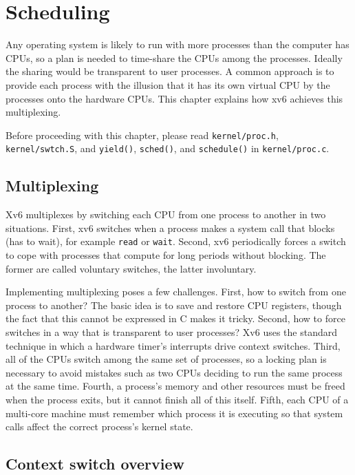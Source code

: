 % 
%  
\chapter{Scheduling}
\label{CH:SCHED}

Any operating system is likely to run with more processes than the
computer has CPUs, so a plan is needed to time-share the
CPUs among the processes. Ideally the sharing would be transparent to user
processes.  A common approach is to provide each process
with the illusion that it has its own virtual CPU by
the processes onto the hardware CPUs.
This chapter explains how xv6 achieves this multiplexing.

Before proceeding with this chapter, please read {\tt kernel/proc.h},
{\tt kernel/swtch.S},
and
{\tt yield()},
{\tt sched()},
and
{\tt schedule()}
in {\tt kernel/proc.c}.

\section{Multiplexing}

Xv6 multiplexes by switching each CPU from one process to
another in two situations. First, xv6
switches when a process makes a system
call that blocks (has to wait), for example \lstinline{read} or
\lstinline{wait}.
Second, xv6 periodically forces a switch to cope with
processes that compute for long periods without blocking.
The former are called voluntary switches,
the latter involuntary.

Implementing multiplexing poses a few challenges. First, how to switch from one
process to another? 
The basic idea is to save and restore CPU registers,
though the fact that this cannot be expressed in C makes it tricky.
Second, how to force
switches in a way that is transparent to user processes?  Xv6 uses the
standard technique in which a hardware timer's interrupts drive context switches.
Third, all of the CPUs switch among the same set of processes, so a
locking plan is necessary to avoid mistakes such as two CPUs deciding
to run the same process at the same time. Fourth, a process's
memory and other resources must be freed when the process exits,
but it cannot finish all of this itself.
Fifth, each CPU of a multi-core machine must remember which
process it is executing so that system calls affect the correct
process's kernel state.

\section{Context switch overview}

